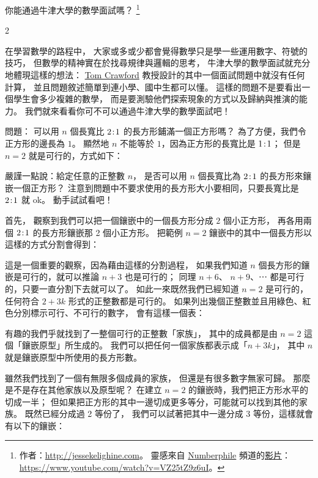\documentclass{article}
\begin{document}
\centerline{%
	\large\textsf{你能通過牛津大學的數學面試嗎？}%
	\footnote{%
		作者：\url{http://jessekelighine.com}。
		靈感來自
		\href{https://www.youtube.com/channel/UCoxcjq-8xIDTYp3uz647V5A}{Numberphile}
		頻道的\href{https://www.youtube.com/watch?v=VZ25tZ9z6uI}{影片}：
		\url{https://www.youtube.com/watch?v=VZ25tZ9z6uI}。
	}
}

\begin{multicols*}{2}

在學習數學的路程中，
大家或多或少都會覺得數學只是學一些運用數字、符號的技巧，
但數學的精神實在於找尋規律與邏輯的思考，
牛津大學的數學面試就充分地體現這樣的想法：
\href{https://www.seh.ox.ac.uk/people/tom-crawford}{Tom Crawford}
教授設計的其中一個面試問題中就沒有任何計算，
並且問題敘述簡單到連小學、國中生都可以懂。
這樣的問題不是要看出一個學生會多少複雜的數學，
而是要測驗他們探索現象的方式以及歸納與推演的能力。
我們就來看看你可不可以通過牛津大學的數學面試吧！

\textsf{問題}：
可以用 $n$ 個長寬比 $2\!:\!1$ 的長方形鋪滿一個正方形嗎？
為了方便，我們令正方形的邊長為 $1$。
顯然地 $n$ 不能等於 $1$，因為正方形的長寬比是 $1\!:\!1$；
但是 $n=2$ 就是可行的，方式如下：


\noindent
嚴謹一點說：給定任意的正整數 $n$，
是否可以用 $n$ 個長寬比為 $2\!:\!1$ 的長方形來鑲嵌一個正方形？
注意到問題中不要求使用的長方形大小要相同，只要長寬比是 $2\!:\!1$ 就 ok。
動手試試看吧！

\separationline

首先，
觀察到我們可以把一個鑲嵌中的一個長方形分成 $2$ 個小正方形，
再各用兩個 $2\!:\!1$ 的長方形鑲嵌那 2 個小正方形。
把範例 $n=2$ 鑲嵌中的其中一個長方形以這樣的方式分割會得到：


\noindent
這是一個重要的觀察，因為藉由這樣的分割過程，
如果我們知道 $n$ 個長方形的鑲嵌是可行的，就可以推論 $n+3$ 也是可行的；
同理 $n+6$、 $n+9$、⋯ 都是可行的，只要一直分割下去就可以了。
如此一來既然我們已經知道 $n=2$ 是可行的，
任何符合 $2+3k$ 形式的正整數都是可行的。
如果列出幾個正整數並且用綠色、紅色分別標示可行、不可行的數字，
會有這樣一個表：


\noindent
有趣的我們乎就找到了一整個可行的正整數「家族」，
其中的成員都是由 $n=2$ 這個「鑲嵌原型」所生成的。
我們可以把任何一個家族都表示成「$n+3k$」，
其中 $n$ 就是鑲嵌原型中所使用的長方形數。

雖然我們找到了一個有無限多個成員的家族，
但還是有很多數字無家可歸。
那麼是不是存在其他家族以及原型呢？
在建立 $n=2$ 的鑲嵌時，我們把正方形水平的切成一半；
但如果把正方形的其中一邊切成更多等分，可能就可以找到其他的家族。
既然已經分成過 2 等份了，
我們可以試著把其中一邊分成 3 等份，這樣就會有以下的鑲嵌：


\end{multicols*}
\end{document}
